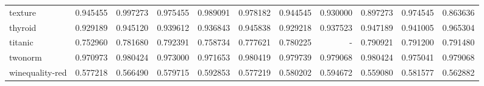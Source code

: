 \begin{tabular}{lrrrrrrrrrr}
texture         &   0.945455 &  0.997273 &  0.975455 &  0.989091 &  0.978182 &  0.944545 &  0.930000 &  0.897273 &  0.974545 &  0.863636 \\
thyroid         &   0.929189 &  0.945120 &  0.939612 &  0.936843 &  0.945838 &  0.929218 &  0.937523 &  0.947189 &  0.941005 &  0.965304 \\
titanic         &   0.752960 &  0.781680 &  0.792391 &  0.758734 &  0.777621 &  0.780225 &       - &  0.790921 &  0.791200 &  0.791480 \\
twonorm         &   0.970973 &  0.980424 &  0.973000 &  0.971653 &  0.980419 &  0.979739 &  0.979068 &  0.980424 &  0.975041 &  0.979068 \\
winequality-red &   0.577218 &  0.566490 &  0.579715 &  0.592853 &  0.577219 &  0.580202 &  0.594672 &  0.559080 &  0.581577 &  0.562882 \\
\bottomrule
\end{tabular}
